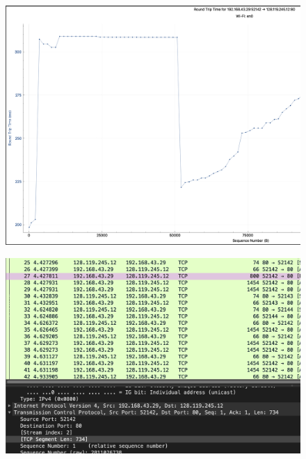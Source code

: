 \begin{figure}
\centering
\includegraphics[scale=0.32]{tcp-graph}
\caption{}
\end{figure}

\problem{}
 
 
\begin{figure}
	\centering
	\includegraphics[scale= 0.53]{s8-1.png}
	\caption{ }
\end{figure}

